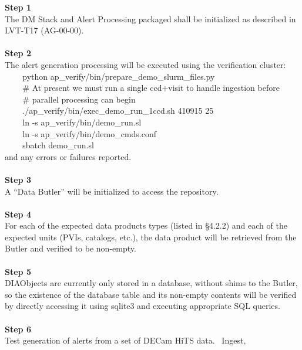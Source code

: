 \textbf{Step 1}\\
The DM Stack and Alert Processing packaged shall be initialized as
described in LVT-T17 (AG-00-00).\\
~\\
\textbf{Step 2}\\
The alert generation processing will be executed using the verification
cluster:\\
\hspace*{0.333em} ~ ~ ~python
ap\_verify/bin/prepare\_demo\_slurm\_files.py\\
\hspace*{0.333em} ~ ~ ~\# At present we must run a single ccd+visit to
handle ingestion before\\
\hspace*{0.333em} ~ ~ ~\# parallel processing can begin\\
\hspace*{0.333em} ~ ~ ~./ap\_verify/bin/exec\_demo\_run\_1ccd.sh 410915
25\\
\hspace*{0.333em} ~ ~ ~ln -s ap\_verify/bin/demo\_run.sl\\
\hspace*{0.333em} ~ ~ ~ln -s ap\_verify/bin/demo\_cmds.conf\\
\hspace*{0.333em} ~ ~ ~sbatch demo\_run.sl\\
and any errors or failures reported.\\
~\\
\textbf{Step 3}\\
A ``Data Butler'' will be initialized to access the repository.\\
~\\
\textbf{Step 4}\\
For each of the expected data products types (listed in §4.2.2) and each
of the expected units (PVIs, catalogs, etc.), the data product will be
retrieved from the Butler and verified to be non-empty.\\
~\\
\textbf{Step 5}\\
DIAObjects are currently only stored in a database, without shims to the
Butler, so the existence of the database table and its non-empty
contents will be verified by directly accessing it using sqlite3 and
executing appropriate SQL queries.\\
~\\
\textbf{Step 6}\\
Test generation of alerts from a set of DECam HiTS data. ~Ingest,
